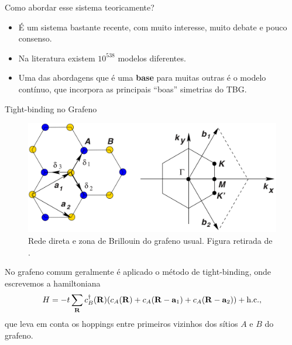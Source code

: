 \documentclass[8pt,aspectratio=169,xcolor={table,dvipsnames,usenames}]{beamer}
\begin{document}

\begin{frame}

\begin{center}
\huge Como abordar esse sistema teoricamente?
\end{center}

\n\n\n\n

\begin{itemize}
\item É um sistema bastante recente, com muito interesse, muito debate e pouco consenso.
\item Na literatura existem $10^{538}$ modelos diferentes.
\item Uma das abordagens que é uma \textbf{base} para muitas outras é o modelo contínuo, que incorpora as principais ``boas'' simetrias do TBG.
\end{itemize}

\end{frame}


\begin{frame}{Tight-binding no Grafeno}

\begin{figure}[H]
\centering
\includegraphics[width=0.5\linewidth]{fig/monolayer.png}
\caption{Rede direta e zona de Brillouin do grafeno usual. Figura retirada de \cite{castroneto}.}
\label{fig:monolayer}
\end{figure}

No grafeno comum geralmente é aplicado o método de tight-binding, onde escrevemos a hamiltoniana
$$
H = -t \sum_{\vb{R}} c^\dagger_B(\vb{R}) \qty(c_A(\vb{R}) + c_A(\vb{R}-\vb{a}_1) + c_A(\vb{R}-\vb{a}_2)) + \text{h.c.},
$$
que leva em conta os hoppings entre primeiros vizinhos dos sítios $A$ e $B$ do grafeno.

\end{frame}

\end{document}
